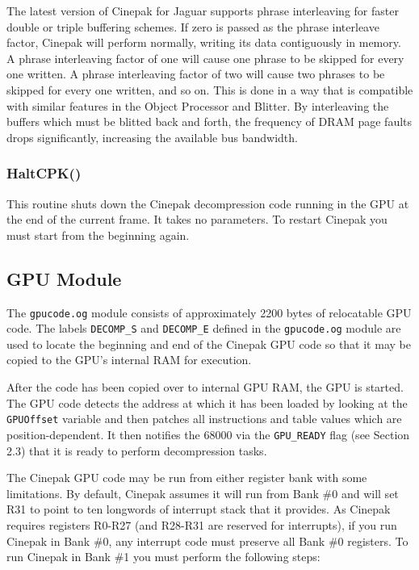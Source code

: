 \documentclass[12pt,letterpaper,twoside]{article}
\begin{document}
The latest version of Cinepak for Jaguar supports phrase interleaving for faster double or triple buffering schemes. If zero is passed as the phrase interleave factor, Cinepak will perform normally, writing its data contiguously in memory. A phrase interleaving factor of one will cause one phrase to be skipped for every one written. A phrase interleaving factor of two will cause two phrases to be skipped for every one written, and so on. This is done in a way that is compatible with similar features in the Object Processor and Blitter. By interleaving the buffers which must be blitted back and forth, the frequency of DRAM page faults drops significantly, increasing the available bus bandwidth.

\subsubsection{HaltCPK()}
This routine shuts down the Cinepak decompression code running in the GPU at the end of the current frame. It takes no parameters. To restart Cinepak you must start from the beginning again.

\subsection{GPU Module}
The \texttt{gpucode.og} module consists of approximately 2200 bytes of relocatable GPU code. The labels \texttt{DECOMP\_S} and \texttt{DECOMP\_E} defined in the \texttt{gpucode.og} module are used to locate the beginning and end of the Cinepak GPU code so that it may be copied to the GPU's internal RAM for execution.

After the code has been copied over to internal GPU RAM, the GPU is started. The GPU code detects the address at which it has been loaded by looking at the \texttt{GPUOffset} variable and then patches all instructions and table values which are position-dependent. It then notifies the 68000 via the \texttt{GPU\_READY} flag (see Section 2.3) that it is ready to perform decompression tasks.

The Cinepak GPU code may be run from either register bank with some limitations. By default, Cinepak assumes it will run from Bank \#0 and will set R31 to point to ten longwords of interrupt stack that it provides. As Cinepak requires registers R0-R27 (and R28-R31 are reserved for interrupts), if you run Cinepak in Bank \#0, any interrupt code must preserve all Bank \#0 registers. To run Cinepak in Bank \#1 you must perform the following steps:
\end{document}
